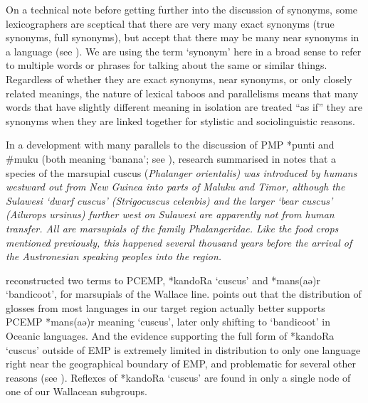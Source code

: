 On a technical note before getting further into the discussion
of synonyms, some lexicographers are sceptical that there are very many exact
synonyms (true synonyms, full synonyms),
but accept that there may be many near synonyms
in a language (see \citealp{Zgusta1971}).
We are using the term ‘synonym’ here in a broad sense to refer
to multiple words or phrases for talking about the same or similar things.
Regardless of whether they are exact synonyms,
near synonyms, or only closely related meanings,
the nature of lexical taboos
and parallelisms means that many words that have slightly different
meaning in isolation are treated “as if” they are synonyms when
they are linked together for stylistic and sociolinguistic reasons.

In a development with many parallels to the discussion of PMP
*punti and {\#}muku (both meaning ‘banana’; see ),
research summarised in \citet[260]{Schapper2011} notes that a species
of the marsupial cuscus (\it{Phalanger orientalis}) was introduced
by humans westward out from New Guinea into parts of Maluku
and Timor, although the Sulawesi ‘dwarf cuscus’ (\it{Strigocuscus
celenbis}) and the larger ‘bear cuscus’ (\it{Ailurops ursinus}) further
west on Sulawesi are apparently not from human transfer.
All are marsupials of the family \it{Phalangeridae}.
Like the food crops mentioned previously,
this happened several thousand years before the arrival of the
Austronesian speaking peoples into the region.

\citet{Blust1982} reconstructed two terms to
PCEMP, *kandoRa ‘cuscus’ and *mans(aə)r ‘bandicoot’, for marsupials
 of the Wallace line.
\citet{Schapper2011} points out that the distribution of glosses
from most languages in our target region actually better supports
PCEMP *mans(aə)r meaning ‘cuscus’,
later only shifting to ‘bandicoot’ in Oceanic languages.
And the evidence supporting the full form of *kandoRa ‘cuscus’
outside of EMP is extremely limited in distribution to only one
language right near the geographical boundary of EMP,
and problematic for several other reasons (see ).
Reflexes of *kandoRa ‘cuscus’ are found in only a single node
of one of our Wallacean subgroups.


